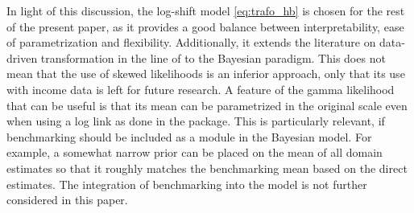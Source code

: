 In light of this discussion, the log-shift model \ref{eq:trafo_hb} is chosen for the rest of the present paper, as it provides a good balance between interpretability, ease of parametrization and flexibility.
Additionally, it extends the literature on data-driven transformation in the line of \cite{rojas_perilla_data_2020} to the Bayesian paradigm.
This does not mean that the use of skewed likelihoods is an inferior approach, only that its use with income data is left for future research.
A feature of the gamma likelihood that can be useful is that its mean can be parametrized in the original scale even when using a log link as done in the  package.
This is particularly relevant, if benchmarking \citep{pfeffermann_new_2013} should be included as a module in the Bayesian model.
For example, a somewhat narrow prior can be placed on the mean of all domain estimates so that it roughly matches the benchmarking mean based on the direct estimates.
The integration of benchmarking into the model is not further considered in this paper.


